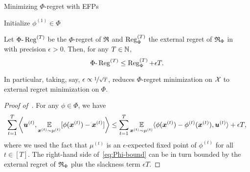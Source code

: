 \begin{algorithm}[!ht]
\caption{Minimizing $\Phi$-regret with EFPs~\citep{Gordon08:No,Zhang24:Efficient}}
\label{alg:gordon}
\;
Initialize $\phi^{(1)} \in \Phi$\;
\end{algorithm}

\begin{theorem}
    \label{theorem:gordon}
    Let $\Phi\text{-}\operatorname{Reg}^{(T)}$ be the $\Phi$-regret of $\mathfrak{R}$ and $\operatorname{Reg}_{\Phi}^{(T)}$ the external regret of $\mathfrak{R}_\Phi$ in~ with precision $\epsilon > 0$. Then, for any $T \in \mathbb N$,
    \begin{equation}
        \Phi\text{-}\operatorname{Reg}^{(T)} \leq \operatorname{Reg}_{\Phi}^{(T)} +  \epsilon T.
    \end{equation}
\end{theorem}

In particular, taking, say, $\epsilon \propto \nicefrac{1}{\sqrt{T}}$,  reduces $\Phi$-regret minimization on ${\mathcal{X}}$ to external regret minimization on $\Phi$.

\begin{proof}[Proof of~]
    For any $\phi \in \Phi$, we have
    \begin{equation}
        \label{eq:Phi-bound}
        \sum_{t=1}^T \left\langle {\bm{u}}^{(t)}, \operatorname*{\mathbb E}_{{\bm{x}}^{(t)} \sim \mu^{(t)}} [ \phi({\bm{x}}^{(t)}) - {\bm{x}}^{(t)} ] \right\rangle \leq \sum_{t=1}^T \operatorname*{\mathbb E}_{{\bm{x}}^{(t)} \sim \mu^{(t)}} \langle \phi({\bm{x}}^{(t)}) - \phi^{(t)}({\bm{x}}^{(t)}), {\bm{u}}^{(t)} \rangle + \epsilon T,
    \end{equation}
    where we used the fact that $\mu^{(t)}$ is an $\epsilon$-expected fixed point of $\phi^{(t)}$ for all $t \in [T]$. The right-hand side of~\eqref{eq:Phi-bound} can be in turn bounded by the external regret of $\mathfrak{R}_\Phi$ plus the slackness term $\epsilon T$.
\end{proof}

